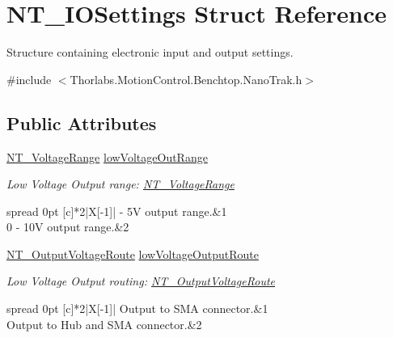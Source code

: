 \hypertarget{struct_n_t___i_o_settings}{}\section{N\+T\+\_\+\+I\+O\+Settings Struct Reference}
\label{struct_n_t___i_o_settings}


Structure containing electronic input and output settings.  




{\ttfamily \#include $<$Thorlabs.\+Motion\+Control.\+Benchtop.\+Nano\+Trak.\+h$>$}

\subsection*{Public Attributes}
\begin{DoxyCompactItemize}
\item 
\hyperlink{group___common_ga4bade700cfdb3b3ac039a82c1df53cf7}{N\+T\+\_\+\+Voltage\+Range} \hyperlink{struct_n_t___i_o_settings_ac21219e77c0adb8b3bb99c812b7059fe}{low\+Voltage\+Out\+Range}
\begin{DoxyCompactList}\small\item\em Low Voltage Output range\+: \hyperlink{group___common_ga4bade700cfdb3b3ac039a82c1df53cf7}{N\+T\+\_\+\+Voltage\+Range} \tabulinesep=1mm
\begin{longtabu} spread 0pt [c]{*2{|X[-1]}|}
 -\/ 5V output range.&1 \\
0 -\/ 10V output range.&2 \\
\end{longtabu}
\end{DoxyCompactList}\item 
\hyperlink{group___common_ga4740d0dfe32cadf4e1d23954e95719bd}{N\+T\+\_\+\+Output\+Voltage\+Route} \hyperlink{struct_n_t___i_o_settings_a5f1576ca69d373343f47ae4b204792f8}{low\+Voltage\+Output\+Route}
\begin{DoxyCompactList}\small\item\em Low Voltage Output routing\+: \hyperlink{group___common_ga4740d0dfe32cadf4e1d23954e95719bd}{N\+T\+\_\+\+Output\+Voltage\+Route} \tabulinesep=1mm
\begin{longtabu} spread 0pt [c]{*2{|X[-1]}|}
\hline
Output to S\+MA connector.&1 \\
Output to Hub and S\+MA connector.&2 \\
\end{longtabu}

\end{DoxyCompactList}
\end{DoxyCompactItemize}
